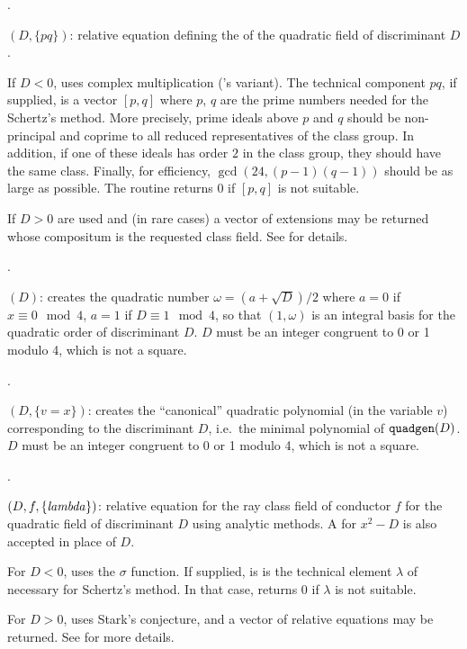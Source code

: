 .

$(D,\{pq\})$: relative equation defining the
 of the quadratic field of discriminant $D$.

If $D < 0$, uses complex multiplication ('s variant). The
technical component $pq$, if supplied, is a vector $[p,q]$ where $p$, $q$ are
the prime numbers needed for the Schertz's method. More precisely, prime
ideals above $p$ and $q$ should be non-principal and coprime to all reduced
representatives of the class group. In addition, if one of these ideals has
order $2$ in the class group, they should have the same class. Finally, for
efficiency, $\gcd(24,(p-1)(q-1))$ should be as large as possible.
The routine returns $0$ if $[p,q]$ is not suitable.

If $D > 0$  are used and (in rare cases) a
vector of extensions may be returned whose compositum is the requested class
field. See  for details.

.

$(D)$: \label{se:quadgen}creates the quadratic
number $\omega=(a+\sqrt{D})/2$ where $a=0$ if $x\equiv0\mod4$,
$a=1$ if $D\equiv1\mod4$, so that $(1,\omega)$ is an integral basis for the
quadratic order of discriminant $D$. $D$ must be an integer congruent to 0 or
1 modulo 4, which is not a square.

.

$(D,\{v=x\})$: creates the ``canonical'' quadratic
polynomial (in the variable $v$) corresponding to the discriminant $D$,
i.e.~the minimal polynomial of ${\tt quadgen}(D)$. $D$ must be an integer
congruent to 0 or 1 modulo 4, which is not a square.

.

$(D,f,\{\hbox{\it lambda\/}\})$: relative equation for the ray
class field of conductor $f$ for the quadratic field of discriminant $D$
using analytic methods. A  for $x^2 - D$ is also accepted in place
of $D$.

For $D < 0$, uses the $\sigma$ function. If supplied,  is is the
technical element $\lambda$ of  necessary for Schertz's method. In
that case, returns 0 if $\lambda$ is not suitable.

For $D>0$, uses Stark's conjecture, and a vector of relative equations may be
returned. See  for more details.


